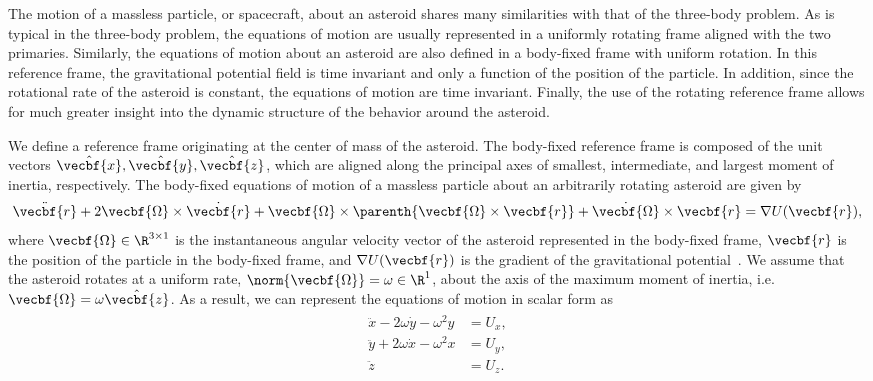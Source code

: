 The motion of a massless particle, or spacecraft, about an asteroid shares many similarities with that of the three-body problem.
As is typical in the three-body problem, the equations of motion are usually represented in a uniformly rotating frame aligned with the two primaries.
Similarly, the equations of motion about an asteroid are also defined in a body-fixed frame with uniform rotation.
In this reference frame, the gravitational potential field is time invariant and only a function of the position of the particle.
In addition, since the rotational rate of the asteroid is constant, the equations of motion are time invariant.
Finally, the use of the rotating reference frame allows for much greater insight into the dynamic structure of the behavior around the asteroid.

We define a reference frame originating at the center of mass of the asteroid.
The body-fixed reference frame is composed of the unit vectors \( \hat{\vecbf{x}} , \hat{\vecbf{y}}, \hat{\vecbf{z}} \), which are aligned along the principal axes of smallest, intermediate, and largest moment of inertia, respectively.
The body-fixed equations of motion of a massless particle about an arbitrarily rotating asteroid are given by
\begin{align}\label{eq:body_eoms}
    \ddot{\vecbf{r}} + 2 \vecbf{\Omega} \times \dot{\vecbf{r}} + \vecbf{\Omega} \times \parenth{ \vecbf{\Omega} \times \vecbf{r} } + \dot{\vecbf{\Omega}} \times \vecbf{r} = \nabla U(\vecbf{r}) ,
\end{align}
where \( \vecbf{\Omega} \in \R^{3 \times 1}\) is the instantaneous angular velocity vector of the asteroid represented in the body-fixed frame, \( \vecbf{r} \) is the position of the particle in the body-fixed frame, and \( \nabla U(\vecbf{r}) \) is the gradient of the gravitational potential~\cite{scheeres2012a}.
We assume that the asteroid rotates at a uniform rate, \( \norm{\vecbf{\Omega}} = \omega \in \R^1 \), about the axis of the maximum moment of inertia, i.e.\ \( \vecbf{\Omega} = \omega \hat{\vecbf{z} }\).
As a result, we can represent the equations of motion in scalar form as
\begin{align} \label{eq:eoms}
    \begin{split}
        \ddot{x} - 2 \omega \dot{y} - \omega^2 y &= U_x , \\
        \ddot{y} + 2 \omega \dot{x} - \omega^2 x &= U_y , \\
        \ddot{z} &= U_z .
    \end{split}
\end{align}

